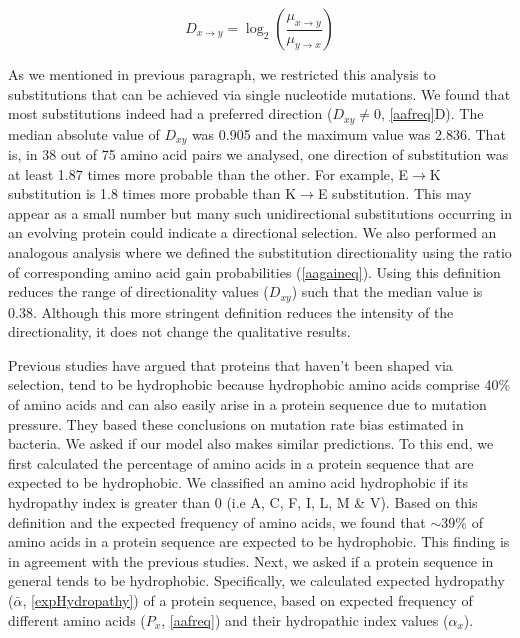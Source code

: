 \documentclass[12pt,a4paper]{article}
\begin{document}
\begin{equation}
\textit{D}_{x\to y} = \log_2\left(\frac{\mu_{x\to y}}{\mu_{y\to x}}\right)
\label{directionality}
\end{equation}

As we mentioned in previous paragraph, we restricted this analysis to substitutions that can be achieved via single nucleotide mutations. We found that most substitutions indeed had a preferred direction ($\textit{D}_{xy} \neq 0$,  \autoref{aafreq}{\color{blue}D}). The median absolute value of $\textit{D}_{xy}$ was 0.905 and the maximum value was 2.836. That is, in 38 out of 75 amino acid pairs we analysed, one direction of substitution was at least 1.87 times more probable than the other. For example, E$\to$K substitution is 1.8 times more probable than K$\to$E substitution. This may appear as a small number but many such unidirectional substitutions occurring in an evolving protein could indicate a directional selection. We also performed an analogous analysis where we defined the substitution directionality using the ratio of corresponding amino acid gain probabilities (\autoref{aagaineq}). Using this definition reduces the range of directionality values ($\textit{D}_{xy}$) such that the median value is 0.38. Although this more stringent definition reduces the intensity of the directionality, it does not change the qualitative results. 


Previous studies have argued that proteins that haven't been shaped via selection, tend to be hydrophobic because hydrophobic amino acids comprise 40\% of amino acids and can also easily arise in a protein sequence due to mutation pressure. They based these conclusions on mutation rate bias estimated in bacteria. We asked if our model also makes similar predictions. To this end, we first calculated the percentage of amino acids in a protein sequence that are expected to be hydrophobic. We classified an amino acid hydrophobic if its hydropathy index \citep{hydropathy} is greater than 0 (i.e A, C, F, I, L, M \& V). Based on this definition and the expected frequency of amino acids, we found that $\sim$39\% of amino acids in a protein sequence are expected to be hydrophobic. This finding is in agreement with the previous studies. Next, we asked if a protein sequence in general tends to be hydrophobic. Specifically, we calculated expected hydropathy ($\bar{\alpha}$, \autoref{expHydropathy}) of a protein sequence, based on expected frequency of different amino acids ($P_x$, \autoref{aafreq}) and their hydropathic index values ($\alpha_x$). 
\end{document}

